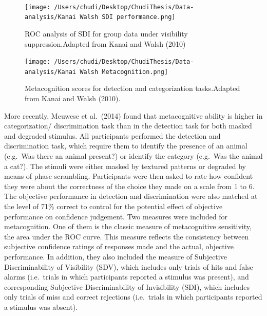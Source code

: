 \documentclass[
]{article}
\begin{document}
~

\begin{figure}
\centering
\texttt{[image: /Users/chudi/Desktop/ChudiThesis/Data-analysis/Kanai Walsh SDI performance.png]}
\caption{ROC analysis of SDI for group data under visibility
suppression.Adapted from Kanai and Walsh (2010)}
\end{figure}

\begin{figure}
\centering
\texttt{[image: /Users/chudi/Desktop/ChudiThesis/Data-analysis/Kanai Walsh Metacognition.png]}
\caption{Metacognition scores for detection and categorization
tasks.Adapted from Kanai and Walsh (2010).}
\end{figure}

More recently, Meuwese et al.~(2014) found that metacognitive ability is
higher in categorization/ discrimination task than in the detection task
for both masked and degraded stimulus. All participants performed the
detection and discrimination task, which require them to identify the
presence of an animal (e.g.~Was there an animal present?) or identify
the category (e.g.~Was the animal a cat?). The stimuli were either
masked by textured patterns or degraded by means of phase scrambling.
Participants were then asked to rate how confident they were about the
correctness of the choice they made on a scale from 1 to 6. The
objective performance in detection and discrimination were also matched
at the level of 71\% correct to control for the potential effect of
objective performance on confidence judgement. Two measures were
included for metacognition. One of them is the classic measure of
metacognitive sensitivity, the area under the ROC curve. This measure
reflects the consistency between subjective confidence ratings of
responses made and the actual, objective performance. In addition, they
also included the measure of Subjective Discriminability of Visibility
(SDV), which includes only trials of hits and false alarms (i.e.~trials
in which participants reported a stimulus was present), and
corresponding Subjective Discriminability of Invisibility (SDI), which
includes only trials of miss and correct rejections (i.e.~trials in
which participants reported a stimulus was absent).
\end{document}
